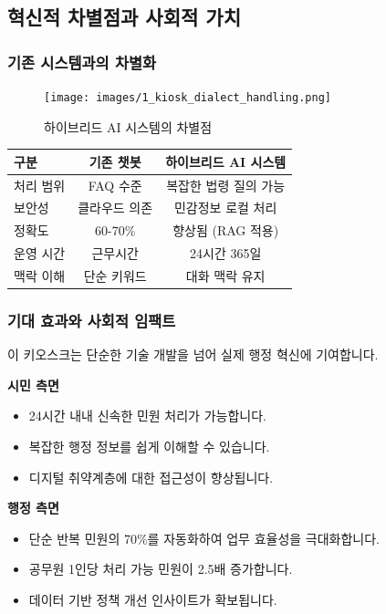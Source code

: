 \subsection{혁신적 차별점과 사회적 가치}

\subsubsection{기존 시스템과의 차별화}

\begin{figure}[H]
    \centering
    \texttt{[image: images/1\_kiosk\_dialect\_handling.png]}
    \caption{하이브리드 AI 시스템의 차별점}
    \label{fig:kiosk_dialect_handling}
\end{figure}

\begin{tabular}{|l|c|c|}
\hline
\textbf{구분} & \textbf{기존 챗봇} & \textbf{하이브리드 AI 시스템} \\
\hline
처리 범위 & FAQ 수준 & 복잡한 법령 질의 가능 \\
보안성 & 클라우드 의존 & 민감정보 로컬 처리 \\
정확도 & 60-70\% & 향상됨 (RAG 적용)\\
운영 시간 & 근무시간 & 24시간 365일 \\
맥락 이해 & 단순 키워드 & 대화 맥락 유지 \\
\hline
\end{tabular}

\subsubsection{기대 효과와 사회적 임팩트}

이 키오스크는 단순한 기술 개발을 넘어 실제 행정 혁신에 기여합니다.

\textbf{시민 측면}
\begin{itemize}
    \item 24시간 내내 신속한 민원 처리가 가능합니다.
    \item 복잡한 행정 정보를 쉽게 이해할 수 있습니다.
    \item 디지털 취약계층에 대한 접근성이 향상됩니다.
\end{itemize}

\textbf{행정 측면}
\begin{itemize}
    \item 단순 반복 민원의 70\%를 자동화하여 업무 효율성을 극대화합니다.
    \item 공무원 1인당 처리 가능 민원이 2.5배 증가합니다.
    \item 데이터 기반 정책 개선 인사이트가 확보됩니다.
\end{itemize}

